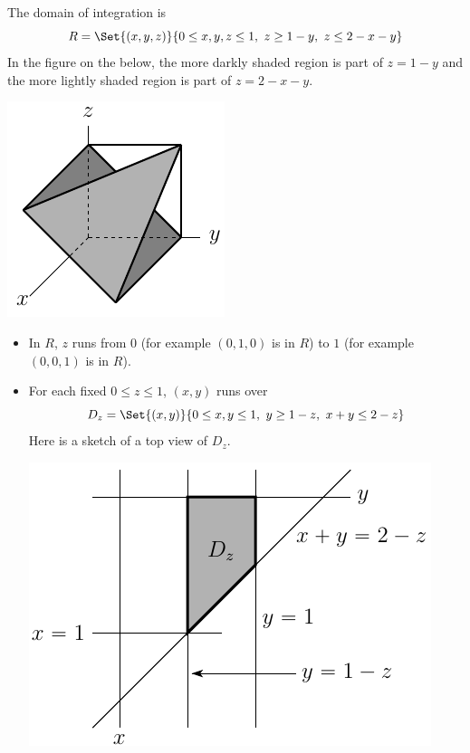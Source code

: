 \begin{solution}
The domain of integration is 
\begin{equation*}
R = \Set{(x,y,z)}{0\le x,y,z\le 1,\ z\ge 1-y,\ z\le2-x-y}
\end{equation*}
In the figure on the  below, the more darkly shaded region 
is part of $z=1-y$ and the more lightly shaded region is part
of $z=2-x-y$. 
\begin{center}
     \includegraphics{fig/domainPartCube1.pdf}
\end{center} 
\begin{itemize}
\item
In $R$, $z$ runs from $0$ (for example $(0,1,0)$ is in $R$)
to $1$ (for example $(0,0,1)$ is in $R$).
\item
For each fixed $0\le z\le 1$, $(x,y)$ runs over
\begin{equation*}
D_z = \Set{(x,y)}{0\le x,y\le 1,\ y\ge 1-z,\ x+y\le2-z}
\end{equation*}
Here is a sketch of a top view of $D_z$.
\begin{center}
     \includegraphics{fig/domainPartCube2.pdf}
\end{center} 

\end{itemize}
\end{solution}
